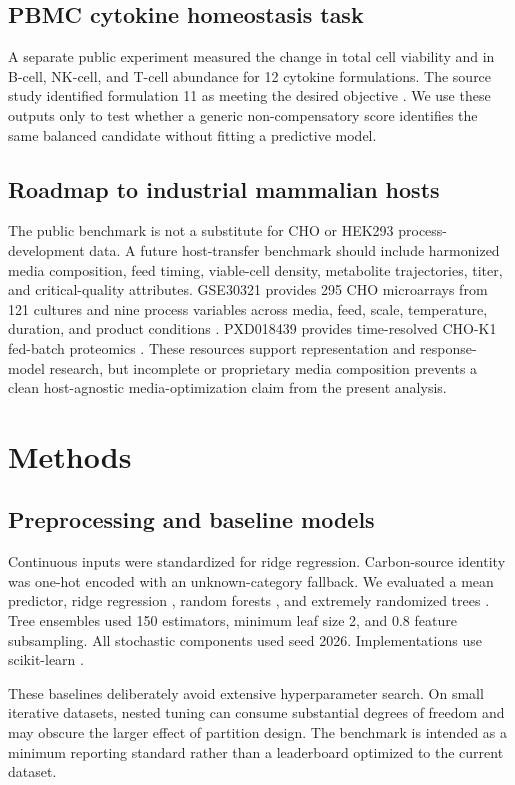 \documentclass[11pt]{article}
\begin{document}
\subsection{PBMC cytokine homeostasis task}
A separate public experiment measured the change in total cell viability and in B-cell, NK-cell, and T-cell abundance for 12 cytokine formulations. The source study identified formulation 11 as meeting the desired objective \cite{narayanan2025}. We use these outputs only to test whether a generic non-compensatory score identifies the same balanced candidate without fitting a predictive model.

\subsection{Roadmap to industrial mammalian hosts}
The public benchmark is not a substitute for CHO or HEK293 process-development data. A future host-transfer benchmark should include harmonized media composition, feed timing, viable-cell density, metabolite trajectories, titer, and critical-quality attributes. GSE30321 provides 295 CHO microarrays from 121 cultures and nine process variables across media, feed, scale, temperature, duration, and product conditions \cite{gse30321,clarke2011}. PXD018439 provides time-resolved CHO-K1 fed-batch proteomics \cite{pxd018439}. These resources support representation and response-model research, but incomplete or proprietary media composition prevents a clean host-agnostic media-optimization claim from the present analysis.

\section{Methods}
\subsection{Preprocessing and baseline models}
Continuous inputs were standardized for ridge regression. Carbon-source identity was one-hot encoded with an unknown-category fallback. We evaluated a mean predictor, ridge regression \cite{hoerl1970}, random forests \cite{breiman2001}, and extremely randomized trees \cite{geurts2006}. Tree ensembles used 150 estimators, minimum leaf size 2, and 0.8 feature subsampling. All stochastic components used seed 2026. Implementations use scikit-learn \cite{pedregosa2011}.

These baselines deliberately avoid extensive hyperparameter search. On small iterative datasets, nested tuning can consume substantial degrees of freedom and may obscure the larger effect of partition design. The benchmark is intended as a minimum reporting standard rather than a leaderboard optimized to the current dataset.
\end{document}
